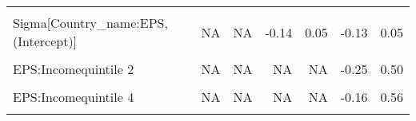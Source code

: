 \begin{table}
\begin{tabular}[t]{lrrrrrr}
\cellcolor{gray!10}{b[EPS Country\_name:US]} & \cellcolor{gray!10}{NA} & \cellcolor{gray!10}{NA} & \cellcolor{gray!10}{-0.31} & \cellcolor{gray!10}{0.26} & \cellcolor{gray!10}{-0.31} & \cellcolor{gray!10}{0.23}\\
Sigma[Country\_name:EPS,(Intercept)] & NA & NA & -0.14 & 0.05 & -0.13 & 0.05\\
\cellcolor{gray!10}{Sigma[Country\_name:EPS,EPS]} & \cellcolor{gray!10}{NA} & \cellcolor{gray!10}{NA} & \cellcolor{gray!10}{0.01} & \cellcolor{gray!10}{0.20} & \cellcolor{gray!10}{0.01} & \cellcolor{gray!10}{0.20}\\
EPS:Incomequintile 2 & NA & NA & NA & NA & -0.25 & 0.50\\
\cellcolor{gray!10}{EPS:Incomequintile 3} & \cellcolor{gray!10}{NA} & \cellcolor{gray!10}{NA} & \cellcolor{gray!10}{NA} & \cellcolor{gray!10}{NA} & \cellcolor{gray!10}{-0.28} & \cellcolor{gray!10}{0.47}\\
EPS:Incomequintile 4 & NA & NA & NA & NA & -0.16 & 0.56\\
\cellcolor{gray!10}{EPS:Incomequintile 5} & \cellcolor{gray!10}{NA} & \cellcolor{gray!10}{NA} & \cellcolor{gray!10}{NA} & \cellcolor{gray!10}{NA} & \cellcolor{gray!10}{-0.37} & \cellcolor{gray!10}{0.33}\\
\bottomrule
\end{tabular}
\end{table}
